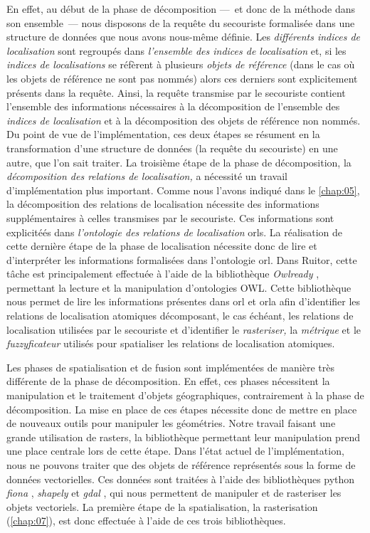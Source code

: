 En effet, au début de la phase de décomposition ---~et donc de la
méthode dans son ensemble~--- nous disposons de la requête du
secouriste formalisée dans une structure de données que nous avons
nous-même définie. Les \emph{différents indices de localisation} sont
regroupés dans \emph{l'ensemble des indices de localisation} et, si
les \emph{indices de localisations} se réfèrent à plusieurs
\emph{objets de référence} (\ie dans le cas où les objets de référence
ne sont pas nommés) alors ces derniers sont explicitement présents
dans la requête. Ainsi, la requête transmise par le secouriste
contient l'ensemble des informations nécessaires à la décomposition de
l'ensemble des \emph{indices de localisation} et à la décomposition
des objets de référence non nommés. Du point de vue de
l'implémentation, ces deux étapes se résument en la transformation
d'une structure de données (la requête du secouriste) en une autre,
que l'on sait traiter. La troisième étape de la phase de
décomposition, la \emph{décomposition des relations de localisation,}
a nécessité un travail d'implémentation plus important. Comme nous
l'avons indiqué dans le \autoref{chap:05}, la décomposition des
relations de localisation nécessite des informations supplémentaires à
celles transmises par le secouriste. Ces informations sont explicitéés
dans \emph{l'ontologie des relations de localisation} \acp{orl}. La
réalisation de cette dernière étape de la phase de localisation
nécessite donc de lire et d'interpréter les informations formalisées
dans l'ontologie \ac{orl}. Dans Ruitor, cette tâche est principalement
effectuée à l'aide de la bibliothèque \emph{Owlready}
\autocite{Lamy2017}, permettant la lecture et la manipulation
d'ontologies OWL. Cette bibliothèque nous permet de lire les
informations présentes dans \ac{orl} et \ac{orla} afin d'identifier
les relations de localisation atomiques décomposant, le cas échéant,
les relations de localisation utilisées par le secouriste et
d'identifier le \emph{rasteriser,} la \emph{métrique} et le
\emph{fuzzyficateur} utilisés pour spatialiser les relations de
localisation atomiques.

Les phases de spatialisation et de fusion sont implémentées de manière
très différente de la phase de décomposition. En effet, ces phases
nécessitent la manipulation et le traitement d'objets géographiques,
contrairement à la phase de décomposition. La mise en place de ces
étapes nécessite donc de mettre en place de nouveaux outils pour
manipuler les géométries. Notre travail faisant une grande utilisation
de rasters, la bibliothèque permettant leur manipulation prend une
place centrale lors de cette étape. Dans l'état actuel de
l'implémentation, nous ne pouvons traiter que des objets de référence
représentés sous la forme de données vectorielles. Ces données sont
traitées à l'aide des bibliothèques python \emph{fiona}
\autocite{Gillies2020a}, \emph{shapely} \autocite{Gillies2020} et
\emph{gdal} \autocite{GDAL2020}, qui nous permettent de manipuler et
de rasteriser les objets vectoriels. La première étape de la
spatialisation, la rasterisation (\autoref{chap:07}), est donc
effectuée à l'aide de ces trois bibliothèques.

